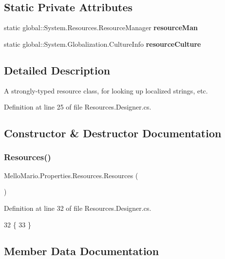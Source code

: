 \subsection*{Static Private Attributes}
\begin{DoxyCompactItemize}
\item 
static global\+::\+System.\+Resources.\+Resource\+Manager \textbf{ resource\+Man}
\item 
static global\+::\+System.\+Globalization.\+Culture\+Info \textbf{ resource\+Culture}
\end{DoxyCompactItemize}


\subsection{Detailed Description}
A strongly-\/typed resource class, for looking up localized strings, etc. 



Definition at line 25 of file Resources.\+Designer.\+cs.



\subsection{Constructor \& Destructor Documentation}
\mbox{\label{classMelloMario_1_1Properties_1_1Resources_a36412f08ef2c8c31e4d299ae8f4a411a}} 
\subsubsection{Resources()}
{\footnotesize\ttfamily Mello\+Mario.\+Properties.\+Resources.\+Resources (\begin{DoxyParamCaption}{ }\end{DoxyParamCaption})\hspace{0.3cm}{\ttfamily [package]}}



Definition at line 32 of file Resources.\+Designer.\+cs.


\begin{DoxyCode}
32                              \{
33         \}
\end{DoxyCode}


\subsection{Member Data Documentation}
\mbox{\label{classMelloMario_1_1Properties_1_1Resources_a44203d7fffd14b5855e76cc5c5c182cf}} 
